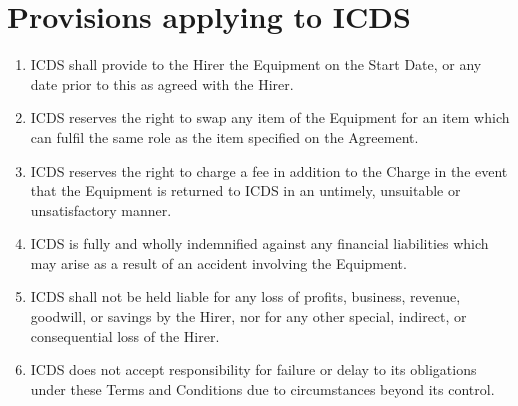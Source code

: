 \documentclass[a4paper]{tufte-handout}
\begin{document}
\section{Provisions applying to ICDS}
\begin{enumerate}[resume]
    \item ICDS shall provide to the Hirer the Equipment on the Start Date, or any date prior to this as agreed with the Hirer.
    \item ICDS reserves the right to swap any item of the Equipment for an item which can fulfil the same role as the item specified on the Agreement.
    \item ICDS reserves the right to charge a fee in addition to the Charge in the event that the Equipment is returned to ICDS in an untimely, unsuitable or unsatisfactory manner.
    \item ICDS is fully and wholly indemnified against any financial liabilities which may arise as a result of an accident involving the Equipment.
    \item ICDS shall not be held liable for any loss of profits, business, revenue, goodwill, or savings by the Hirer, nor for any other special, indirect, or consequential loss of the Hirer.
    \item ICDS does not accept responsibility for failure or delay to its obligations under these Terms and Conditions due to circumstances beyond its control.
\end{enumerate}
\end{document}
